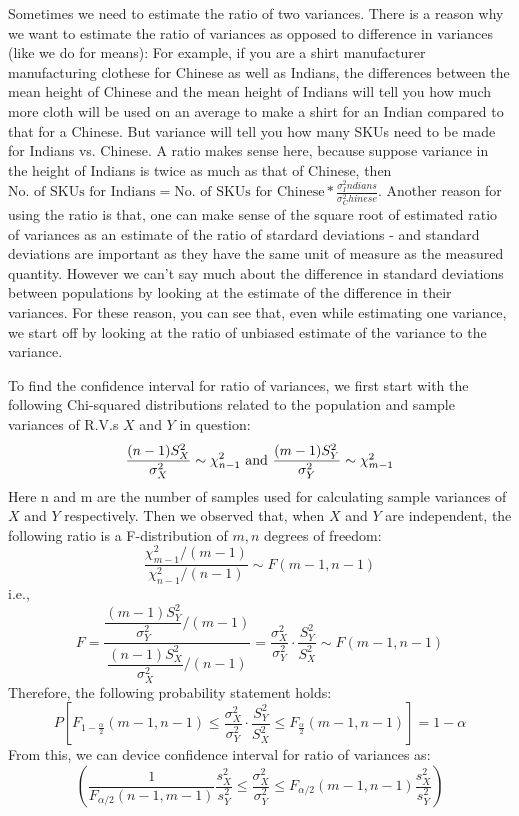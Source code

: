 Sometimes we need to estimate the ratio of two variances. There is a reason why we want to estimate the ratio of variances as opposed to difference in variances (like we do for means): For example, if you are a shirt manufacturer manufacturing clothese for Chinese as well as Indians, the differences between the mean height of Chinese and the mean height of Indians will tell you how much more cloth will be used on an average to make a shirt for an Indian compared to that for a Chinese. But variance will tell you how many SKUs need to be made for Indians vs. Chinese. A ratio makes sense here, because suppose variance in the height of Indians is twice as much as that of Chinese, then \( \text{No. of SKUs for Indians} = \text{No. of SKUs for Chinese} * \frac{\sigma^2_Indians}{\sigma^2_Chinese} \). Another reason for using the ratio is that, one can make sense of the square root of estimated ratio of variances as an estimate of the ratio of stardard deviations - and standard deviations are important as they have the same unit of measure as the measured quantity. However we can't say much about the difference in standard deviations between populations by looking at the estimate of the difference in their variances. For these reason, you can see that, even while estimating one variance, we start off by looking at the ratio of unbiased estimate of the variance to the variance. 

To find the confidence interval for ratio of variances, we first start with the following Chi-squared distributions related to the population and sample variances of R.V.s \(X\) and \(Y\) in question:
	\[ \dfrac{(n-1)S^2_X}{\sigma^2_X}\sim \chi^2_{n-1}\) and \(\dfrac{(m-1)S^2_Y}{\sigma^2_Y}\sim \chi^2_{m-1} \]
Here n and m are the number of samples used for calculating sample variances of \(X\) and \(Y\) respectively. Then we observed that, when \(X\) and \(Y\) are independent, the following ratio is a F-distribution of \(m,n\) degrees of freedom:
	\[ \dfrac{\chi^2_{m-1}/(m-1)}{\chi^2_{n-1}/(n-1)} \sim F(m-1, n-1) \]  
i.e., 
	\[ F=\dfrac{\dfrac{(m-1)S^2_Y}{\sigma^2_Y}/(m-1)}{\dfrac{(n-1)S^2_X}{\sigma^2_X}/(n-1)}=\dfrac{\sigma^2_X}{\sigma^2_Y}\cdot \dfrac{S^2_Y}{S^2_X} \sim F(m-1,n-1) \]	
Therefore, the following probability statement holds:
	\[ P\left[F_{1-\frac{\alpha}{2}}(m-1,n-1) \leq \dfrac{\sigma^2_X}{\sigma^2_Y}\cdot \dfrac{S^2_Y}{S^2_X} \leq F_{\frac{\alpha}{2}}(m-1,n-1)\right]=1-\alpha \]
From this, we can device confidence interval for ratio of variances as:
 	\[ \left(\dfrac{1}{F_{\alpha/2}(n-1,m-1)} \dfrac{s^2_X}{s^2_Y} \leq \dfrac{\sigma^2_X}{\sigma^2_Y}\leq F_{\alpha/2}(m-1,n-1)\dfrac{s^2_X}{s^2_Y}\right) \]

